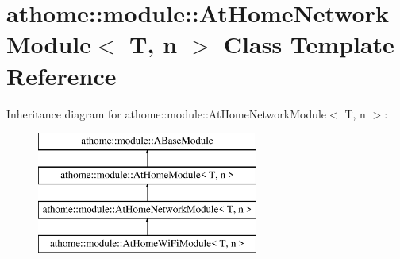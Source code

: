 \hypertarget{classathome_1_1module_1_1_at_home_network_module}{}\section{athome\+:\+:module\+:\+:At\+Home\+Network\+Module$<$ T, n $>$ Class Template Reference}
\label{classathome_1_1module_1_1_at_home_network_module}
Inheritance diagram for athome\+:\+:module\+:\+:At\+Home\+Network\+Module$<$ T, n $>$\+:\begin{figure}[H]
\begin{center}
\leavevmode
\includegraphics[height=4.000000cm]{classathome_1_1module_1_1_at_home_network_module}
\end{center}
\end{figure}
